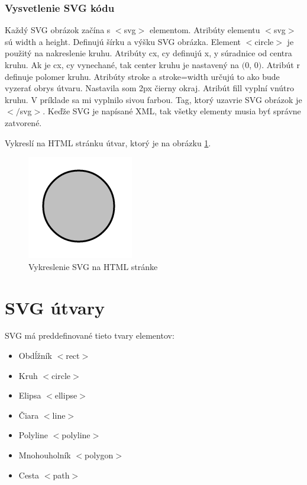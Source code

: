 \subsubsection{Vysvetlenie SVG kódu}

Každý SVG obrázok začína s $<$svg$>$ elementom. Atribúty elementu $<$svg$>$ sú width a height. Definujú šírku a výšku SVG obrázka. Element $<$circle$>$ je použitý na nakreslenie kruhu. Atribúty cx, cy definujú x, y súradnice od centra kruhu. Ak je cx, cy vynechané, tak center kruhu je nastavený na $($0, 0$)$. Atribút r  definuje polomer kruhu. Atribúty stroke a stroke=width určujú to ako bude vyzerať obrys útvaru. Nastavila som 2px čierny okraj. 
Atribút fill vyplní vnútro kruhu. V príklade sa mi vyplnilo sivou farbou. Tag, ktorý uzavrie SVG obrázok je $<$$/$svg$>$. Keďže SVG je napísané XML, tak všetky elementy musia byť správne zatvorené. 


Vykreslí na HTML stránku útvar, ktorý je na obrázku \ref{jednoduchyKruh}.

\begin{figure}[ht]
	\begin{center}
		\includegraphics  {obrazky/jednoduchyKruh.png}
		\caption{Vykreslenie SVG na HTML stránke}
		\label{jednoduchyKruh}
	\end{center}
\end{figure}


\section{SVG útvary} 

\acs*{SVG} má preddefinované tieto tvary elementov:
\begin{itemize}
	\item Obdĺžník $<$rect$>$
	\item Kruh $<$circle$>$
	\item Elipsa $<$ellipse$>$
	\item Čiara $<$line$>$
	\item Polyline $<$polyline$>$
	\item Mnohouholník $<$polygon$>$
	\item Cesta $<$path$>$	
\end{itemize}

